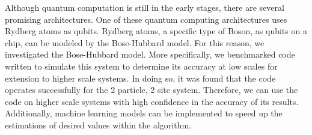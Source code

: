 Although quantum computation is still in the early stages, there are several promising architectures. One of these quantum computing architectures uses Rydberg atoms as qubits. Rydberg atoms, a specific type of Boson, as qubits on a chip, can be modeled by the Bose-Hubbard model. For this reason, we investigated the Bose-Hubbard model. More specifically, we benchmarked code written to simulate this system to determine its accuracy at low scales for extension to higher scale systems. In doing so, it was found that the code operates successfully for the 2 particle, 2 site system. Therefore, we can use the code on higher scale systems with high confidence in the accuracy of its results. Additionally, machine learning models can be implemented to speed up the estimations of desired values within the algorithm.
